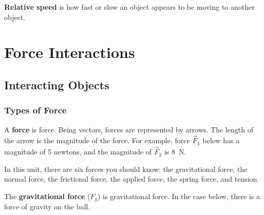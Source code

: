 \documentclass[dvipsnames]{article}
\newif\ifShowUnitII                              %
\begin{document}
\textbf{Relative speed} is how fast or slow an object appears to be moving to another object.




\fi

\clearpage

\section{Force Interactions}

\ifShowUnitII
\setcounter{example}{0}

\subsection{Interacting Objects}

\subsubsection{Types of Force}

A \textbf{\gls{force}} is \glsdesc{force}. Being vectors, forces are represented by arrows. The length of the arrow is the magnitude of the force. For example, force $\vec{F}_1$ below has a magnitude of 5 newtons, and the magnitude of $\vec{F}_2$ is \SI{8}{N}.

\begin{center}
\end{center}

In this unit, there are six forces you should know: the gravitational force, the normal force, the frictional force, the applied force, the spring force, and tension.


The \textbf{\gls{gravitational force}} ($F_g$) is \glsdesc{gravitational force}. In the case below, there is a force of gravity on the ball. 

\begin{center}
\end{center}
\end{document}
